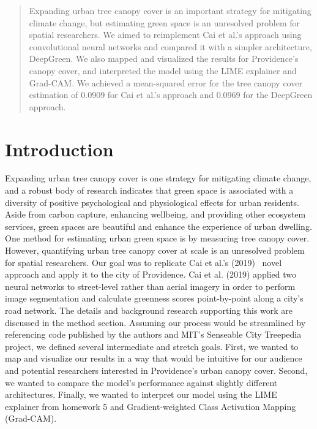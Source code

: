 \author{\emph{Urban Canopy Cover}: Elizabeth Zhang, Jenny Tan, Filip Kierzenka, Alexander Kamper\\
Brown University\\
}

\maketitle

\begin{abstract}
Expanding urban tree canopy cover is an important strategy for mitigating climate change, but estimating green space is an unresolved problem for spatial researchers. We aimed to reimplement Cai et al.’s approach using convolutional neural networks and compared it with a simpler architecture, DeepGreen. We also mapped and visualized the results for Providence’s canopy cover, and interpreted the model using the LIME explainer and Grad-CAM. We achieved a mean-squared error for the tree canopy cover estimation of 0.0909 for Cai et al.’s approach and 0.0969 for the DeepGreen approach.
\end{abstract}




\section{Introduction}
Expanding urban tree canopy cover is one strategy for mitigating climate change, and a robust body of research indicates that green space is associated with a diversity of positive psychological and physiological effects for urban residents. Aside from carbon capture, enhancing wellbeing, and providing other ecosystem services, green spaces are beautiful and enhance the experience of urban dwelling. One method for estimating urban green space is by measuring tree canopy cover. However, quantifying urban tree canopy cover at scale is an unresolved problem for spatial researchers. Our goal was to replicate Cai et al.’s (2019)~\cite{Cai2019} novel approach and apply it to the city of Providence. Cai et al. (2019) applied two neural networks to street-level rather than aerial imagery in order to perform image segmentation and calculate greenness scores point-by-point along a city’s road network. The details and background research supporting this work are discussed in the method section. Assuming our process would be streamlined by referencing code published by the authors and MIT’s Senseable City Treepedia project, we defined several intermediate and stretch goals. First, we wanted to map and visualize our results in a way that would be intuitive for our audience and potential researchers interested in Providence’s urban canopy cover. Second, we wanted to compare the model’s performance against slightly different architectures. Finally, we wanted to interpret our model using the LIME explainer from homework 5 and Gradient-weighted Class Activation Mapping (Grad-CAM).


